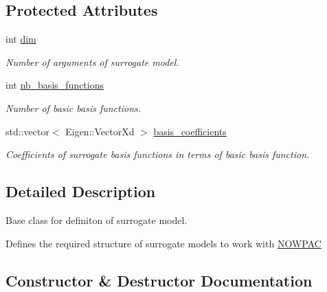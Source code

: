 \subsection*{Protected Attributes}
\begin{DoxyCompactItemize}
\item 
int \hyperlink{class_basis_for_surrogate_model_base_class_a9dd09707324ce387de41e9b53be7e2a4}{dim}\hypertarget{class_basis_for_surrogate_model_base_class_a9dd09707324ce387de41e9b53be7e2a4}{}\label{class_basis_for_surrogate_model_base_class_a9dd09707324ce387de41e9b53be7e2a4}

\begin{DoxyCompactList}\small\item\em Number of arguments of surrogate model. \end{DoxyCompactList}\item 
int \hyperlink{class_basis_for_surrogate_model_base_class_a358550a9b97fbe227f57245a77ebd686}{nb\+\_\+basis\+\_\+functions}
\begin{DoxyCompactList}\small\item\em Number of basic basis functions. \end{DoxyCompactList}\item 
std\+::vector$<$ Eigen\+::\+Vector\+Xd $>$ \hyperlink{class_basis_for_surrogate_model_base_class_a283b40834f051a9ee4896206cbaf9f1f}{basis\+\_\+coefficients}\hypertarget{class_basis_for_surrogate_model_base_class_a283b40834f051a9ee4896206cbaf9f1f}{}\label{class_basis_for_surrogate_model_base_class_a283b40834f051a9ee4896206cbaf9f1f}

\begin{DoxyCompactList}\small\item\em Coefficients of surrogate basis functions in terms of basic basis function. \end{DoxyCompactList}\end{DoxyCompactItemize}


\subsection{Detailed Description}
Base class for definiton of surrogate model. 

Defines the required structure of surrogate models to work with \hyperlink{class_n_o_w_p_a_c}{N\+O\+W\+P\+AC} 

\subsection{Constructor \& Destructor Documentation}
